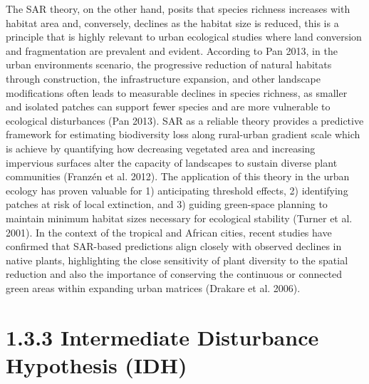 The SAR theory, on the other hand, posits that species richness increases with habitat area and, conversely, declines as the habitat size is reduced, this is a principle that is highly relevant to urban ecological studies where land conversion and fragmentation are prevalent and evident. According to Pan 2013, in the urban environments scenario, the progressive reduction of natural habitats through construction, the infrastructure expansion, and other landscape modifications often leads to measurable declines in species richness, as smaller and isolated patches can support fewer species and are more vulnerable to ecological disturbances (Pan 2013). SAR as a reliable theory provides a predictive framework for estimating biodiversity loss along rural-urban gradient scale which is achieve by quantifying how decreasing vegetated area and increasing impervious surfaces alter the capacity of landscapes to sustain diverse plant communities (Franzén et al. 2012). The application of this theory in the urban ecology has proven valuable for 1) anticipating threshold effects, 2) identifying patches at risk of local extinction, and 3) guiding green-space planning to maintain minimum habitat sizes necessary for ecological stability (Turner et al. 2001). In the context of the tropical and African cities, recent studies have confirmed that SAR-based predictions align closely with observed declines in native plants, highlighting the close sensitivity of plant diversity to the spatial reduction and also the importance of conserving the continuous or connected green areas within expanding urban matrices (Drakare et al. 2006).
\hypertarget{intermediate-disturbance-hypothesis-idh}{%
\section{\texorpdfstring{\textbf{1.3.3 Intermediate Disturbance Hypothesis (IDH)}}{1.3.3 Intermediate Disturbance Hypothesis (IDH)}}\label{intermediate-disturbance-hypothesis-idh}}

